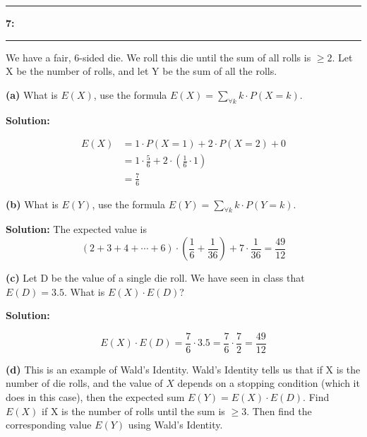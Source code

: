 \documentclass[11pt]{article}
\newcommand\question[2]{\vspace{.25in}\hrule\textbf{#1: #2}\vspace{.5em}\hrule\vspace{.10in}}
\renewcommand\part[1]{\vspace{.10in}\textbf{(#1)}}
\newcommand{\solution}{\vspace{.10in}\textbf{Solution: }}
\begin{document}
\question{7}{} We have a fair, 6-sided die. We roll this die until the sum of all rolls is $\ge 2$. Let X be the number of rolls, and let Y be the sum of all the rolls.

\part{a} What is $E(X)$, use the formula $E(X)=\sum_{\forall k} k\cdot P(X=k)$.

\solution

\begin{align*}
    E(X) &= 1\cdot P(X=1) + 2\cdot P(X=2) + 0 \\
         &= 1\cdot\frac{5}{6} + 2\cdot\left(\frac{1}{6}\cdot 1\right) \\
         &= \frac{7}{6}
\end{align*}

\part{b} What is $E(Y)$, use the formula $E(Y)=\sum_{\forall k} k\cdot P(Y=k)$.

\solution
The expected value is
\begin{equation*}
 \left(2 + 3+4+\cdots +6\right)  \cdot \left( \frac{1}{6} +\frac{1}{36} \right)  +7\cdot \frac{1}{36} =\frac{49}{12}
\end{equation*}

\part{c} Let D be the value of a single die roll. We have seen in class that $E(D) = 3.5$. What is $E(X) \cdot E(D)$?

\solution

\begin{equation*}
    E(X) \cdot E(D) = \frac{7}{6} \cdot 3.5 = \frac{7}{6} \cdot \frac{7}{2} = \frac{49}{12}
\end{equation*}

\part{d} This is an example of Wald's Identity. Wald's Identity tells us that if X is the number of die rolls, and the value of $X$ depends on a stopping condition (which it does in this case), then the expected sum $E(Y) = E(X) \cdot E(D)$. Find $E(X)$ if X is the number of rolls until the sum is $\ge 3$. Then find the corresponding value $E(Y)$ using Wald's Identity.
\end{document}
